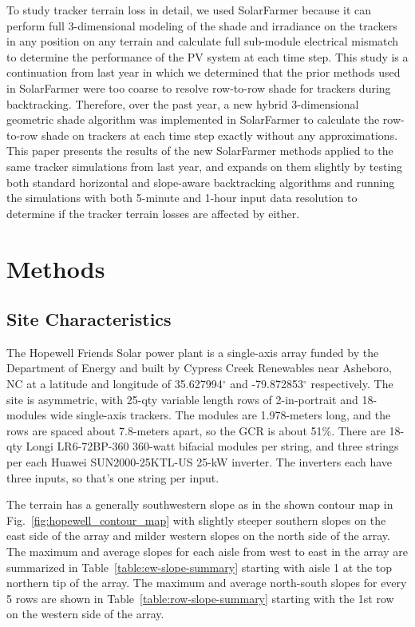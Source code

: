 \documentclass[conference]{IEEEtran}
\begin{document}
To study tracker terrain loss in detail, we used SolarFarmer \cite{Mikofski_8547323} because it can perform full 3-dimensional modeling of the shade and irradiance on the trackers in any position on any terrain and calculate full sub-module electrical mismatch to determine the performance of the PV system at each time step. This study is a continuation from last year \cite{Mikofski_9300381} in which we determined that the prior methods used in SolarFarmer were too coarse to resolve row-to-row shade for trackers during backtracking. Therefore, over the past year, a new hybrid 3-dimensional geometric shade algorithm was implemented in SolarFarmer to calculate the row-to-row shade on trackers at each time step exactly without any approximations. This paper presents the results of the new SolarFarmer methods applied to the same tracker simulations from last year, and expands on them slightly by testing both standard horizontal and slope-aware backtracking algorithms and running the simulations with both 5-minute and 1-hour input data resolution to determine if the tracker terrain losses are affected by either.

\section{Methods}

\subsection{Site Characteristics}

The Hopewell Friends Solar power plant is a single-axis array funded by the Department of Energy and built by Cypress Creek Renewables \cite{CypressCreekRenewables2019} near Asheboro, NC at a latitude and longitude of 35.627994$^\circ$ and -79.872853$^\circ$ respectively. The site is asymmetric, with 25-qty variable length rows of 2-in-portrait and 18-modules wide single-axis trackers. The modules are 1.978-meters long, and the rows are spaced about 7.8-meters apart, so the GCR is about 51\%. There are 18-qty Longi LR6-72BP-360 360-watt bifacial modules per string, and three strings per each Huawei SUN2000-25KTL-US 25-kW inverter. The inverters each have three inputs, so that's one string per input.

The terrain has a generally southwestern slope as in the shown contour map in Fig.~\ref{fig:hopewell_contour_map} with slightly steeper southern slopes on the east side of the array and milder western slopes on the north side of the array. The maximum and average slopes for each aisle from west to east in the array are summarized in Table~\ref{table:ew-slope-summary} starting with aisle 1 at the top northern tip of the array. The maximum and average north-south slopes for every 5 rows are shown in Table~\ref{table:row-slope-summary} starting with the 1st row on the western side of the array.
\end{document}
